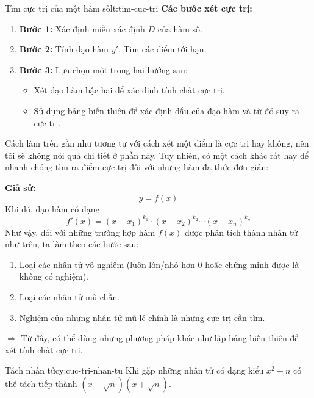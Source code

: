 \begin{lythuyetbox}{Tìm cực trị của một hàm số}{lt:tim-cuc-tri}
\textbf{Các bước xét cực trị:}
\begin{enumerate}
    \item \textbf{Bước 1:} Xác định miền xác định $D$ của hàm số.
    \item \textbf{Bước 2:} Tính đạo hàm $y'$. Tìm các điểm tới hạn.
    \item \textbf{Bước 3:} Lựa chọn một trong hai hướng sau:
    \begin{itemize}
        \item Xét đạo hàm bậc hai để xác định tính chất cực trị.
        \item Sử dụng bảng biến thiên để xác định dấu của đạo hàm và từ đó suy ra cực trị.
    \end{itemize}

\end{enumerate}

Cách làm trên gần như tương tự với cách xét một điểm là cực trị hay không, nên tôi sẽ không nói quá chi tiết ở phần này. Tuy nhiên, có một cách khác rất hay để nhanh chóng tìm ra điểm cực trị đối với những hàm đa thức đơn giản:

\textbf{Giả sử:}
\[
    y = f(x)
\]
Khi đó, đạo hàm có dạng:
\[
    f'(x) = (x - x_1)^{k_1} \cdot (x - x_2)^{k_2} \cdots (x - x_n)^{k_n}
\]
Như vậy, đối với những trường hợp hàm $f(x)$ được phân tích thành nhân tử như trên, ta làm theo các bước sau:
\begin{enumerate}
    \item Loại các nhân tử vô nghiệm (luôn lớn/nhỏ hơn 0 hoặc chứng minh được là không có nghiệm).
    \item Loại các nhân tử mũ chẵn.
    \item Nghiệm của những nhân tử mũ lẻ chính là những cực trị cần tìm. 
\end{enumerate}

\vspace{0.5em}
\noindent
$\Rightarrow$ Từ đây, có thể dùng những phương pháp khác như lập bảng biến thiên để xét tính chất cực trị.

\begin{chuy}{Tách nhân tử}{cy:cuc-tri-nhan-tu}
  Khi gặp những nhân tử có dạng kiểu $x^2 - n$ có thể tách tiếp thành $(x - \sqrt{n})(x + \sqrt{n})$.
\end{chuy}


\end{lythuyetbox}
